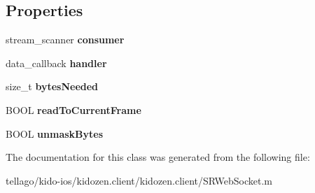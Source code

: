 \subsection*{Properties}
\begin{DoxyCompactItemize}
\item 
\hypertarget{interface_s_r_i_o_consumer_ad46235cab1ad3baf4924fd9b01e9bda3}{stream\-\_\-scanner {\bfseries consumer}}\label{interface_s_r_i_o_consumer_ad46235cab1ad3baf4924fd9b01e9bda3}

\item 
\hypertarget{interface_s_r_i_o_consumer_af42bf5a2dcd7d6b69f1a685db3d9ffee}{data\-\_\-callback {\bfseries handler}}\label{interface_s_r_i_o_consumer_af42bf5a2dcd7d6b69f1a685db3d9ffee}

\item 
\hypertarget{interface_s_r_i_o_consumer_ab297c7d6742e66de2b6383f2eb9004d8}{size\-\_\-t {\bfseries bytes\-Needed}}\label{interface_s_r_i_o_consumer_ab297c7d6742e66de2b6383f2eb9004d8}

\item 
\hypertarget{interface_s_r_i_o_consumer_ae5328f4738b13514641a068913688aec}{B\-O\-O\-L {\bfseries read\-To\-Current\-Frame}}\label{interface_s_r_i_o_consumer_ae5328f4738b13514641a068913688aec}

\item 
\hypertarget{interface_s_r_i_o_consumer_af5261fde4f80ecf462435c83b9b8b987}{B\-O\-O\-L {\bfseries unmask\-Bytes}}\label{interface_s_r_i_o_consumer_af5261fde4f80ecf462435c83b9b8b987}

\end{DoxyCompactItemize}


The documentation for this class was generated from the following file\-:\begin{DoxyCompactItemize}
\item 
tellago/kido-\/ios/kidozen.\-client/kidozen.\-client/S\-R\-Web\-Socket.\-m\end{DoxyCompactItemize}
